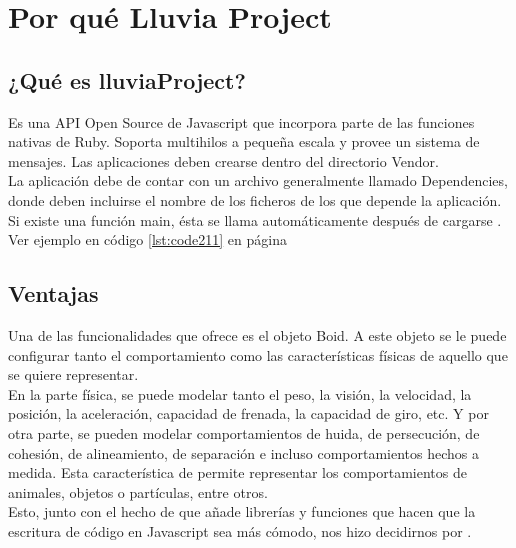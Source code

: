 \section{Por qué Lluvia Project}
\label{section:por_que}

\subsection{¿Qué es lluviaProject?}
\label{subsection:que_es}

Es una API Open Source de Javascript que incorpora parte de las funciones nativas de Ruby. Soporta multihilos a pequeña escala y provee un 
sistema de mensajes. Las aplicaciones deben crearse dentro del directorio Vendor. \\

La aplicación debe de contar con un archivo generalmente llamado Dependencies, donde deben incluirse el nombre de los ficheros de los que 
depende la aplicación. Si existe una función main, ésta se llama automáticamente después de cargarse \lluvia.\\

Ver ejemplo en código \ref{lst:code211} en página \pageref{lst:code211}


\subsection{Ventajas}
\label{subsection:ventajas}


Una de las funcionalidades que ofrece \lluvia{} es el objeto Boid. A este objeto se le puede configurar tanto el comportamiento como las 
características físicas de aquello que se quiere representar.\\

En la parte física, se puede modelar tanto el peso, la visión, la velocidad, la posición, la aceleración, capacidad de frenada, la capacidad 
de giro, etc. Y por otra parte, se pueden modelar comportamientos de huida, de persecución, de cohesión, de alineamiento, de separación e 
incluso comportamientos hechos a medida. Esta característica de \lluvia{} permite representar los comportamientos de animales, objetos 
o partículas, entre otros.\\

Esto, junto con el hecho de que añade librerías y funciones que hacen que la escritura de código en Javascript sea más cómodo, nos hizo 
decidirnos por \lluvia{}.\\
